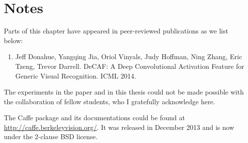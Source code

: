 

\section*{Notes}
Parts of this chapter have appeared in peer-reviewed publications as we list below:
\begin{enumerate}
\item Jeff Donahue, Yangqing Jia, Oriol Vinyals, Judy Hoffman, Ning Zhang, Eric Tzeng, Trevor Darrell. DeCAF: A Deep Convolutional Activation Feature for Generic Visual Recognition. ICML 2014.
\end{enumerate}
The experiments in the paper and in this thesis could not be made possible with the collaboration of fellow students, who I gratefully acknowledge here.

The Caffe package and its documentations could be found at \url{http://caffe.berkeleyvision.org/}. It was released in December 2013 and is now under the 2-clause BSD license.
